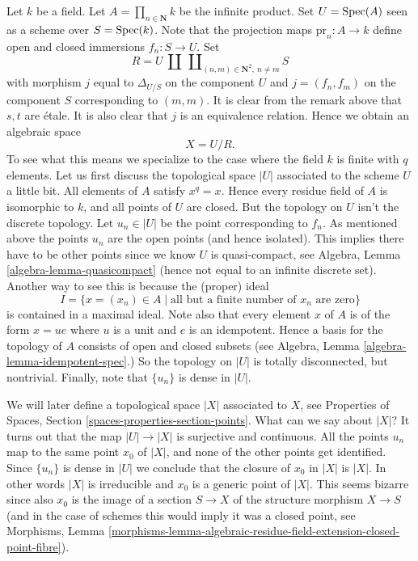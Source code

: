 \begin{example}
\label{example-infinite-product}
Let $k$ be a field.
Let $A = \prod_{n \in \mathbf{N}} k$ be the infinite product.
Set $U = \mathop{\rm Spec}(A)$ seen as a scheme over $S = \mathop{\rm Spec}(k)$.
Note that the projection maps $\text{pr}_n : A \to k$ define open
and closed immersions $f_n : S \to U$. Set
$$
R =
U
\ {\textstyle\coprod}
\ \coprod\nolimits_{(n, m) \in \mathbf{N}^2, \ n \not = m} S
$$
with morphism $j$ equal to $\Delta_{U/S}$ on the component $U$
and $j = (f_n, f_m)$ on the component $S$ corresponding to $(m, m)$.
It is clear from the remark above that $s, t$ are \'etale.
It is also clear that $j$ is an equivalence relation. Hence we
obtain an algebraic space
$$
X = U/R.
$$
To see what this means we specialize to the case where
the field $k$ is finite with $q$ elements. Let us first
discuss the topological space $|U|$ associated to the scheme $U$
a little bit. All elements of $A$ satisfy $x^q = x$.
Hence every residue field of $A$ is isomorphic to $k$, and
all points of $U$ are closed. But the topology on $U$ isn't
the discrete topology. Let $u_n \in |U|$ be the point corresponding
to $f_n$. As mentioned above the points $u_n$ are
the open points (and hence isolated). This implies there have
to be other points since we know $U$ is quasi-compact, see
Algebra, Lemma \ref{algebra-lemma-quasicompact}
(hence not equal to an infinite discrete set).
Another way to see this is because the (proper) ideal
$$
I =
\{x = (x_n) \in A \mid \text{all but a finite number of }x_n\text{ are zero}\}
$$
is contained in a maximal ideal. Note also that every element
$x$ of $A$ is of the form $x = ue$ where $u$ is a unit and $e$ is an
idempotent. Hence a basis for the topology of $A$ consists of open and
closed subsets (see Algebra, Lemma \ref{algebra-lemma-idempotent-spec}.)
So the topology on $|U|$ is totally disconnected, but nontrivial.
Finally, note that $\{u_n\}$ is dense in $|U|$.

\medskip\noindent
We will later define a topological space $|X|$ associated to $X$, see
Properties of Spaces, Section \ref{spaces-properties-section-points}.
What can we say about $|X|$?
It turns out that the map $|U| \to |X|$ is surjective and continuous.
All the points $u_n$ map to the same point $x_0$ of $|X|$, and none of
the other points get identified. Since $\{u_n\}$ is dense in $|U|$ we
conclude that the closure of $x_0$ in $|X|$ is $|X|$. In other words
$|X|$ is irreducible and $x_0$ is a generic point of $|X|$. This seems
bizarre since also $x_0$ is the image of a section
$S \to X$ of the structure morphism $X \to S$ (and in the case of
schemes this would imply it was a closed point, see
Morphisms, Lemma
\ref{morphisms-lemma-algebraic-residue-field-extension-closed-point-fibre}).
\end{example}

